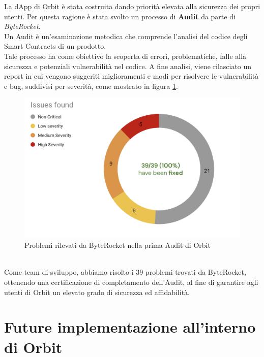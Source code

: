 \documentclass[12pt,a4paper]{report}
\begin{document}
La dApp di Orbit è stata costruita dando priorità elevata alla sicurezza dei propri utenti. Per questa ragione è stata svolto un processo di \textbf{Audit}\cite{audit} da parte di \textit{ByteRocket}.
\\Un Audit è un'esaminazione metodica che comprende l'analisi del codice degli Smart Contracts di un prodotto. \\Tale processo ha come obiettivo la scoperta di errori, problematiche, falle alla sicurezza e potenziali vulnerabilità nel codice. A fine analisi, viene rilasciato un report in cui vengono suggeriti miglioramenti e modi per risolvere le vulnerabilità e bug, suddivisi per severità, come mostrato in figura \ref{fig:audit}. 

\begin{figure}[H]
  \includegraphics[scale=0.40]{audit.png}
  \centering
  \caption{Problemi rilevati da ByteRocket nella prima Audit di Orbit}
  \label{fig:audit}
\end{figure}

\noindent \\Come team di sviluppo, abbiamo risolto i 39 problemi trovati da ByteRocket, ottenendo una certificazione di completamento dell'Audit, al fine di garantire agli utenti di Orbit un elevato grado di sicurezza ed affidabilità.


\chapter{Future implementazione all'interno di Orbit}




\end{document}
